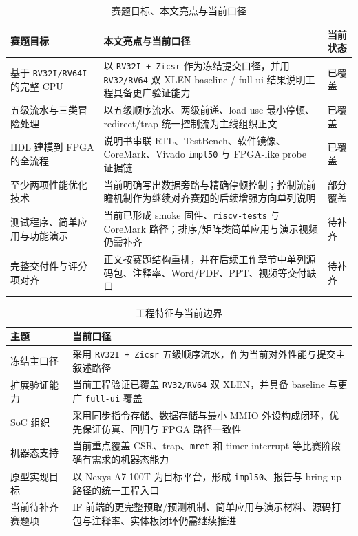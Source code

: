 \begin{table}[H]
    \centering
    \small
    \caption{赛题目标、本文亮点与当前口径}
    \begin{tabularx}{0.95\textwidth}{L{0.26\textwidth} Y L{0.14\textwidth}}
        \toprule
        赛题目标 & 本文亮点与当前口径 & 当前状态 \\
        \midrule
        基于 \texttt{RV32I/RV64I} 的完整 CPU & 以 \texttt{RV32I + Zicsr} 作为冻结提交口径，并用 \texttt{RV32/RV64} 双 XLEN baseline / full-ui 结果说明工程具备更广验证能力 & 已覆盖 \\
        五级流水与三类冒险处理 & 以五级顺序流水、两级前递、load-use 最小停顿、redirect/trap 统一控制流为主线组织正文 & 已覆盖 \\
        HDL 建模到 FPGA 的全流程 & 说明书串联 RTL、TestBench、软件镜像、CoreMark、Vivado \texttt{impl50} 与 FPGA-like probe 证据链 & 已覆盖 \\
        至少两项性能优化技术 & 当前明确写出数据旁路与精确停顿控制；控制流前瞻机制作为继续对齐赛题的后续增强方向单列说明 & 部分覆盖 \\
        测试程序、简单应用与功能演示 & 当前已形成 smoke 固件、\texttt{riscv-tests} 与 CoreMark 路径；排序/矩阵类简单应用与演示视频仍需补齐 & 待补齐 \\
        完整交付件与评分项对齐 & 正文按赛题结构重排，并在后续工作章节中单列源码包、注释率、Word/PDF、PPT、视频等交付缺口 & 待补齐 \\
        \bottomrule
    \end{tabularx}
\end{table}

\begin{table}[H]
    \centering
    \small
    \caption{工程特征与当前边界}
    \begin{tabularx}{0.95\textwidth}{L{0.22\textwidth} Y}
        \toprule
        主题 & 当前口径 \\
        \midrule
        冻结主口径 & 采用 \texttt{RV32I + Zicsr} 五级顺序流水，作为当前对外性能与提交主叙述路径 \\
        扩展验证能力 & 当前工程验证已覆盖 \texttt{RV32/RV64} 双 XLEN，并具备 baseline 与更广 \texttt{full-ui} 覆盖 \\
        SoC 组织 & 采用同步指令存储、数据存储与最小 MMIO 外设构成闭环，优先保证仿真、回归与 FPGA 路径一致性 \\
        机器态支持 & 当前重点覆盖 CSR、trap、\texttt{mret} 和 timer interrupt 等比赛阶段确有需求的机器态能力 \\
        原型实现目标 & 以 Nexys A7-100T 为目标平台，形成 \texttt{impl50}、报告与 bring-up 路径的统一工程入口 \\
        当前待补齐赛题项 & IF 前端的更完整预取/预测机制、简单应用与演示材料、源码打包与注释率、实体板闭环仍需继续推进 \\
        \bottomrule
    \end{tabularx}
\end{table}

